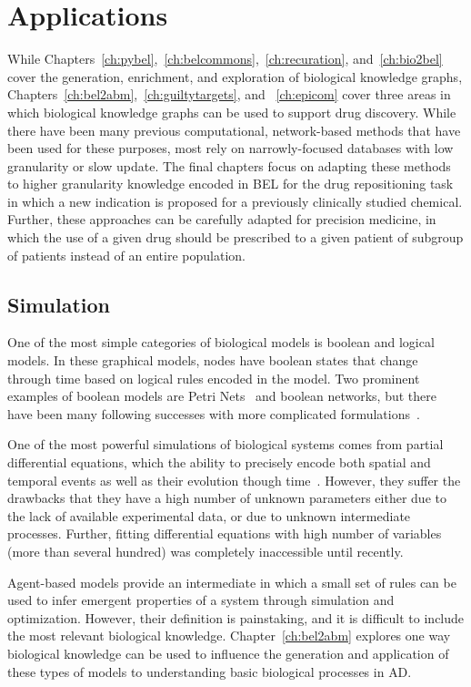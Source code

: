 \section{Applications}
\label{sec:introduction_applications}

While Chapters~\ref{ch:pybel},~\ref{ch:belcommons},~\ref{ch:recuration}, and~\ref{ch:bio2bel} cover the generation, enrichment, and exploration of biological knowledge graphs, Chapters~\ref{ch:bel2abm},~\ref{ch:guiltytargets}, and ~\ref{ch:epicom} cover three areas in which biological knowledge graphs can be used to support drug discovery.
While there have been many previous computational, network-based methods that have been used for these purposes, most rely on narrowly-focused databases with low granularity or slow update.
The final chapters focus on adapting these methods to higher granularity knowledge encoded in BEL for the drug repositioning task in which a new indication is proposed for a previously clinically studied chemical.
Further, these approaches can be carefully adapted for precision medicine, in which the use of a given drug should be prescribed to a given patient of subgroup of patients instead of an entire population.

\subsection{Simulation}

One of the most simple categories of biological models is boolean and logical models.
In these graphical models, nodes have boolean states that change through time based on logical rules encoded in the model.
Two prominent examples of boolean models are Petri Nets~\cite{Peterson1977} and boolean networks\cite{Albert2008}, but there have been many following successes with more complicated formulations~\cite{Saez-Rodriguez2011,Gyori2017,Karlebach2008}.

One of the most powerful simulations of biological systems comes from partial differential equations, which the ability to precisely encode both spatial and temporal events as well as their evolution though time~\cite{Lopez2013}.
However, they suffer the drawbacks that they have a high number of unknown parameters either due to the lack of available experimental data, or due to unknown intermediate processes.
Further, fitting differential equations with high number of variables (more than several hundred) was completely inaccessible until recently.

Agent-based models provide an intermediate in which a small set of rules can be used to infer emergent properties of a system through simulation and optimization.
However, their definition is painstaking, and it is difficult to include the most relevant biological knowledge.
Chapter~\ref{ch:bel2abm} explores one way biological knowledge can be used to influence the generation and application of these types of models to understanding basic biological processes in \ac{AD}.

